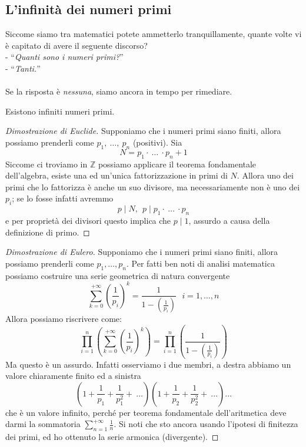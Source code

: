\subsection{L'infinità dei numeri primi}
\label{lezione2}
Siccome siamo tra matematici potete ammetterlo tranquillamente, quante volte vi è capitato di avere il seguente discorso?\\
- \enquote{\textit{Quanti sono i numeri primi?}}\\
- \enquote{\textit{Tanti.}}\\ \\
Se la risposta è \textit{nessuna}, siamo ancora in tempo per rimediare.
\begin{teorema}
	Esistono infiniti numeri primi.
\end{teorema}
\begin{proof}[Dimostrazione di Euclide] Supponiamo che i numeri primi siano finiti, allora possiamo prenderli come $p_1, \ \dots, \ p_n$ (positivi). Sia
	\begin{equation*}
	N = p_1 \cdot \ \dots \ \cdot p_n +1
	\end{equation*}
	Siccome ci troviamo in $\mathbb{Z}$ possiamo applicare il teorema fondamentale dell'algebra, esiste una ed un'unica fattorizzazione in primi di $N$. Allora uno dei primi che lo fattorizza è anche un suo divisore, ma necessariamente non è uno dei $p_i$; se lo fosse infatti avremmo 
	\begin{equation*}
	p\mid N, \ \ p\mid p_1 \cdot \ \dots \ \cdot p_n
	\end{equation*}
	e per proprietà dei divisori questo implica che $p\mid 1$, assurdo a causa della definizione di primo.
\end{proof}
\begin{proof}[Dimostrazione di Eulero] 
	Supponiamo che i numeri primi siano finiti, allora possiamo prenderli come $p_1,\dots, p_n$. Per fatti ben noti di analisi matematica possiamo costruire una serie geometrica di natura convergente
	\begin{equation*}
	\sum_{k=0}^{+\infty}\left(\frac{1}{p_i}\right)^k=\frac{1}{1-\left(\frac{1}{p_i}\right)} \ \ \ i=1,\dots,n
	\end{equation*} 
	Allora possiamo riscrivere come:
	\begin{equation*}
	\prod_{i=1}^n\left(\sum_{k=0}^{+\infty}\left(\frac{1}{p_i}\right)^k\right)=\prod_{i=1}^n\left(\frac{1}{1-\left(\frac{1}{p_i}\right)}\right)
	\end{equation*}
	Ma questo è un assurdo. Infatti osserviamo i due membri, a destra abbiamo un valore chiaramente finito ed a sinistra 
	\begin{equation*}
	\left(1+\frac{1}{p_1}+\frac{1}{p_1^2}+ \ \dots\right)\left(1+\frac{1}{p_2}+\frac{1}{p_2^2}+ \ \dots\right)\dots
	\end{equation*}
	che è un valore infinito, perché per teorema fondamentale dell'aritmetica deve darmi la sommatoria $\sum_{n=1}^{+\infty}\frac{1}{n}$. Si noti che sto ancora usando l'ipotesi di finitezza dei primi, ed ho ottenuto la serie armonica (divergente).
\end{proof}
